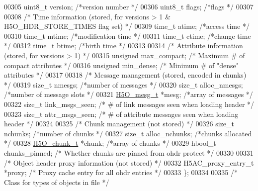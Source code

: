 \begin{DoxyCode}
00305     uint8\_t version;        \textcolor{comment}{/*version number             */}
00306     uint8\_t flags;          \textcolor{comment}{/*flags                  */}
00307 
00308     \textcolor{comment}{/* Time information (stored, for versions > 1 & H5O\_HDR\_STORE\_TIMES flag set) */}
00309     time\_t      atime;                  \textcolor{comment}{/*access time                */}
00310     time\_t      mtime;                  \textcolor{comment}{/*modification time              */}
00311     time\_t      ctime;                  \textcolor{comment}{/*change time                */}
00312     time\_t      btime;                  \textcolor{comment}{/*birth time                 */}
00313 
00314     \textcolor{comment}{/* Attribute information (stored, for versions > 1) */}
00315     \textcolor{keywordtype}{unsigned}    max\_compact;        \textcolor{comment}{/* Maximum # of compact attributes   */}
00316     \textcolor{keywordtype}{unsigned}    min\_dense;      \textcolor{comment}{/* Minimum # of "dense" attributes   */}
00317 
00318     \textcolor{comment}{/* Message management (stored, encoded in chunks) */}
00319     \textcolor{keywordtype}{size\_t}  nmesgs;         \textcolor{comment}{/*number of messages             */}
00320     \textcolor{keywordtype}{size\_t}  alloc\_nmesgs;       \textcolor{comment}{/*number of message slots        */}
00321     \hyperlink{struct_h5_o__mesg__t}{H5O\_mesg\_t}    *mesg;          \textcolor{comment}{/*array of messages          */}
00322     \textcolor{keywordtype}{size\_t}      link\_msgs\_seen;         \textcolor{comment}{/* # of link messages seen when loading header */}
00323     \textcolor{keywordtype}{size\_t}      attr\_msgs\_seen;         \textcolor{comment}{/* # of attribute messages seen when loading header */}
00324 
00325     \textcolor{comment}{/* Chunk management (not stored) */}
00326     \textcolor{keywordtype}{size\_t}  nchunks;        \textcolor{comment}{/*number of chunks           */}
00327     \textcolor{keywordtype}{size\_t}  alloc\_nchunks;      \textcolor{comment}{/*chunks allocated           */}
00328     \hyperlink{struct_h5_o__chunk__t}{H5O\_chunk\_t} *chunk;          \textcolor{comment}{/*array of chunks            */}
00329     hbool\_t     chunks\_pinned;          \textcolor{comment}{/* Whether chunks are pinned from ohdr protect */}
00330 
00331     \textcolor{comment}{/* Object header proxy information (not stored) */}
00332     H5AC\_proxy\_entry\_t *proxy;          \textcolor{comment}{/* Proxy cache entry for all ohdr entries */}
00333 \};
00334 
00335 \textcolor{comment}{/* Class for types of objects in file */}

\end{DoxyCode}
